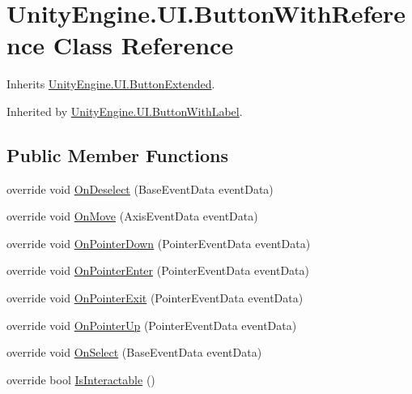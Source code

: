\hypertarget{class_unity_engine_1_1_u_i_1_1_button_with_reference}{}\section{Unity\+Engine.\+U\+I.\+Button\+With\+Reference Class Reference}
\label{class_unity_engine_1_1_u_i_1_1_button_with_reference}


Inherits \hyperlink{class_unity_engine_1_1_u_i_1_1_button_extended}{Unity\+Engine.\+U\+I.\+Button\+Extended}.



Inherited by \hyperlink{class_unity_engine_1_1_u_i_1_1_button_with_label}{Unity\+Engine.\+U\+I.\+Button\+With\+Label}.

\subsection*{Public Member Functions}
\begin{DoxyCompactItemize}
\item 
override void \hyperlink{class_unity_engine_1_1_u_i_1_1_button_with_reference_a6e6e6116fe402b0d0352e73e663efb2a}{On\+Deselect} (Base\+Event\+Data event\+Data)
\item 
override void \hyperlink{class_unity_engine_1_1_u_i_1_1_button_with_reference_ad38323e8985f19c4dcd908c72f988942}{On\+Move} (Axis\+Event\+Data event\+Data)
\item 
override void \hyperlink{class_unity_engine_1_1_u_i_1_1_button_with_reference_a25baf48de124876a65f3befa8d3b682a}{On\+Pointer\+Down} (Pointer\+Event\+Data event\+Data)
\item 
override void \hyperlink{class_unity_engine_1_1_u_i_1_1_button_with_reference_a865365a7e856234feb314364a89cbf84}{On\+Pointer\+Enter} (Pointer\+Event\+Data event\+Data)
\item 
override void \hyperlink{class_unity_engine_1_1_u_i_1_1_button_with_reference_aff367c62f7ee3150dd631244caee80e2}{On\+Pointer\+Exit} (Pointer\+Event\+Data event\+Data)
\item 
override void \hyperlink{class_unity_engine_1_1_u_i_1_1_button_with_reference_ad571d51f37c0c279e5ad5c3f86ac6b6e}{On\+Pointer\+Up} (Pointer\+Event\+Data event\+Data)
\item 
override void \hyperlink{class_unity_engine_1_1_u_i_1_1_button_with_reference_af9a8bc58ae9fc0218ac2ab6c1f876f5a}{On\+Select} (Base\+Event\+Data event\+Data)
\item 
override bool \hyperlink{class_unity_engine_1_1_u_i_1_1_button_with_reference_aac90b278637e0c1470fdaa540d7b335c}{Is\+Interactable} ()
\end{DoxyCompactItemize}
